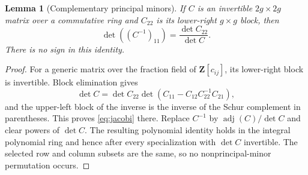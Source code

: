 \documentclass[11pt]{article}
\newtheorem{lemma}[theorem]{Lemma}
\theoremstyle{definition}\newtheorem{definition}[theorem]{Definition}
\theoremstyle{remark}\newtheorem{remark}[theorem]{Remark}
\newcommand{\ZZ}{\mathbf Z}
\begin{document}
\begin{lemma}[Complementary principal minors]\label{lem:minor}
If $C$ is an invertible $2g\times2g$ matrix over a commutative ring and $C_{22}$ is its lower-right $g\times g$ block, then
\begin{equation}\label{eq:jacobi}
 \det((C^{-1})_{11})=\frac{\det C_{22}}{\det C}.
\end{equation}
There is no sign in this identity.
\end{lemma}
\begin{proof}
For a generic matrix over the fraction field of $\ZZ[c_{ij}]$, its lower-right block is invertible. Block elimination gives
\[
 \det C=\det C_{22}\det(C_{11}-C_{12}C_{22}^{-1}C_{21}),
\]
and the upper-left block of the inverse is the inverse of the Schur complement in parentheses. This proves \eqref{eq:jacobi} there. Replace $C^{-1}$ by $\operatorname{adj}(C)/\det C$ and clear powers of $\det C$. The resulting polynomial identity holds in the integral polynomial ring and hence after every specialization with $\det C$ invertible. The selected row and column subsets are the same, so no nonprincipal-minor permutation occurs.
\end{proof}
\end{document}
